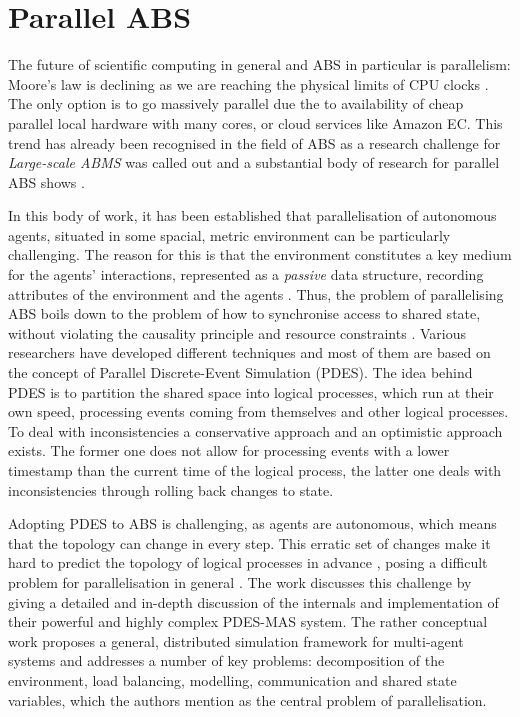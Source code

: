 \chapter{Parallel ABS}
\label{ch:parallel_abs}
The future of scientific computing in general and ABS in particular is parallelism: Moore's law is declining as we are reaching the physical limits of CPU clocks \cite{sutter2005free}. The only option is to go massively parallel due the to availability of cheap parallel local hardware with many cores, or cloud services like Amazon EC. This trend has already been recognised in the field of ABS as a research challenge for \textit{Large-scale ABMS} \cite{macal_everything_2016} was called out and a substantial body of research for parallel ABS shows \cite{abar_agent_2017, cicirelli_efficient_2015,  gasser_mace3j:_2002,  gorur_repast_2016, hay_experiments_2015, himmelspach_plugn_2007, lees_using_2008, logan_distributed_2001, minson_distributing_2008, riley_next_2003, suryanarayanan_synchronised_2013, suryanarayanan_pdes-mas_2013}. 

In this body of work, it has been established that parallelisation of autonomous agents, situated in some spacial, metric environment can be particularly challenging. The reason for this is that the environment constitutes a key medium for the agents' interactions, represented as a \textit{passive} data structure, recording attributes of the environment and the agents \cite{lees_using_2008}. Thus, the problem of parallelising ABS boils down to the problem of how to synchronise access to shared state, without violating the causality principle and resource constraints \cite{logan_distributed_2001, suryanarayanan_pdes-mas_2013}. Various researchers have developed different techniques and most of them are based on the concept of Parallel Discrete-Event Simulation (PDES). The idea behind PDES is to partition the shared space into logical processes, which run at their own speed, processing events coming from themselves and other logical processes. To deal with inconsistencies a conservative approach and an optimistic approach exists. The former one does not allow for processing events with a lower timestamp than the current time of the logical process, the latter one deals with inconsistencies through rolling back changes to state.

Adopting PDES to ABS is challenging, as agents are autonomous, which means that the topology can change in every step. This erratic set of changes make it hard to predict the topology of logical processes in advance \cite{lees_using_2008}, posing a difficult problem for parallelisation in general \cite{cicirelli_efficient_2015}. The work \cite{suryanarayanan_synchronised_2013, suryanarayanan_pdes-mas_2013} discusses this challenge by giving a detailed and in-depth discussion of the internals and implementation of their powerful and highly complex PDES-MAS system. The rather conceptual work \cite{logan_distributed_2001} proposes a general, distributed simulation framework for multi-agent systems and addresses a number of key problems: decomposition of the environment, load balancing, modelling, communication and shared state variables, which the authors mention as the central problem of parallelisation.

